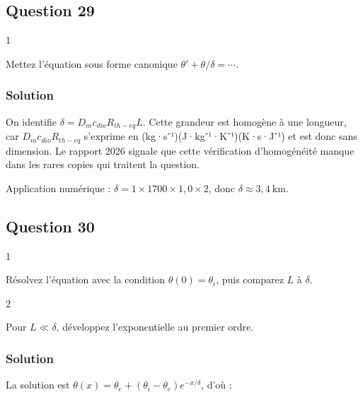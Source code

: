 \documentclass[11pt,a4paper]{article}
\newcommand{\equationajustee}[1]{%
  \sbox{\boiteequation}{$\displaystyle #1$}%
  \ifdim\wd\boiteequation>\linewidth
    \[\resizebox{\linewidth}{!}{\usebox{\boiteequation}}\]%
  \else
    \[#1\]%
  \fi}
\begin{document}
\hypertarget{question-29}{%
\subsection{Question 29}\label{question-29}}

\begin{indication}{1}

Mettez l'équation sous forme canonique \(\theta'+\theta/\delta=\cdots\).

\end{indication}

\hypertarget{solution-28}{%
\subsubsection{Solution}\label{solution-28}}

On identifie \(\boxed{\delta=D_mc_{dio}R_{th-eq}L}\). Cette grandeur est homogène à une longueur, car \(D_mc_{dio}R_{th-eq}\) s'exprime en (kg·s⁻¹)(J·kg⁻¹·K⁻¹)(K·s·J⁻¹) et est donc sans dimension. Le rapport 2026 signale que cette vérification d'homogénéité manque dans les rares copies qui traitent la question.

Application numérique : \(\delta=1\times1700\times1{,}0\times2\), donc \(\boxed{\delta\approx3{,}4\ \text{km}}\).

\hypertarget{question-30}{%
\subsection{Question 30}\label{question-30}}

\begin{indication}{1}

Résolvez l'équation avec la condition \(\theta(0)=\theta_i\), puis comparez \(L\) à \(\delta\).

\end{indication}

\begin{indication}{2}

Pour \(L\ll\delta\), développez l'exponentielle au premier ordre.

\end{indication}

\hypertarget{solution-29}{%
\subsubsection{Solution}\label{solution-29}}

La solution est \(\theta(x)=\theta_e+(\theta_i-\theta_e)e^{-x/\delta}\), d'où :
\equationajustee{\boxed{\Delta\theta=(\theta_e-\theta_i)\left(1-e^{-L/\delta}\right)}}
\end{document}
